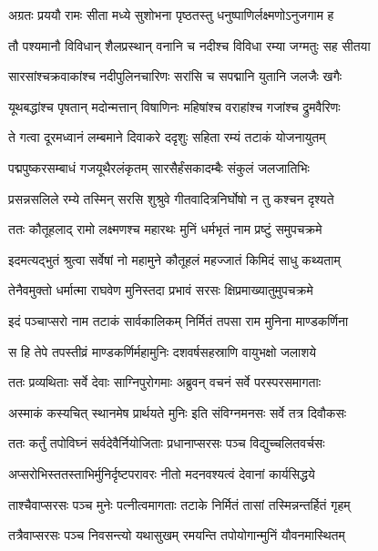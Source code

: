 
\twolineshloka
{अग्रतः प्रययौ रामः सीता मध्ये सुशोभना}
{पृष्ठतस्तु धनुष्पाणिर्लक्ष्मणोऽनुजगाम ह} %

\twolineshloka
{तौ पश्यमानौ विविधान् शैलप्रस्थान् वनानि च}
{नदीश्च विविधा रम्या जग्मतुः सह सीतया} %

\twolineshloka
{सारसांश्चक्रवाकांश्च नदीपुलिनचारिणः}
{सरांसि च सपद्मानि युतानि जलजैः खगैः} %

\twolineshloka
{यूथबद्धांश्च पृषतान् मदोन्मत्तान् विषाणिनः}
{महिषांश्च वराहांश्च गजांश्च द्रुमवैरिणः} %

\twolineshloka
{ते गत्वा दूरमध्वानं लम्बमाने दिवाकरे}
{ददृशुः सहिता रम्यं तटाकं योजनायुतम्} %

\twolineshloka
{पद्मपुष्करसम्बाधं गजयूथैरलंकृतम्}
{सारसैर्हंसकादम्बैः संकुलं जलजातिभिः} %

\twolineshloka
{प्रसन्नसलिले रम्ये तस्मिन् सरसि शुश्रुवे}
{गीतवादित्रनिर्घोषो न तु कश्चन दृश्यते} %

\twolineshloka
{ततः कौतूहलाद् रामो लक्ष्मणश्च महारथः}
{मुनिं धर्मभृतं नाम प्रष्टुं समुपचक्रमे} %

\twolineshloka
{इदमत्यद्भुतं श्रुत्वा सर्वेषां नो महामुने}
{कौतूहलं महज्जातं किमिदं साधु कथ्यताम्} %

\twolineshloka
{तेनैवमुक्तो धर्मात्मा राघवेण मुनिस्तदा}
{प्रभावं सरसः क्षिप्रमाख्यातुमुपचक्रमे} %

\twolineshloka
{इदं पञ्चाप्सरो नाम तटाकं सार्वकालिकम्}
{निर्मितं तपसा राम मुनिना माण्डकर्णिना} %

\twolineshloka
{स हि तेपे तपस्तीव्रं माण्डकर्णिर्महामुनिः}
{दशवर्षसहस्राणि वायुभक्षो जलाशये} %

\twolineshloka
{ततः प्रव्यथिताः सर्वे देवाः साग्निपुरोगमाः}
{अब्रुवन् वचनं सर्वे परस्परसमागताः} %

\twolineshloka
{अस्माकं कस्यचित् स्थानमेष प्रार्थयते मुनिः}
{इति संविग्नमनसः सर्वे तत्र दिवौकसः} %

\twolineshloka
{ततः कर्तुं तपोविघ्नं सर्वदेवैर्नियोजिताः}
{प्रधानाप्सरसः पञ्च विद्युच्चलितवर्चसः} %

\twolineshloka
{अप्सरोभिस्ततस्ताभिर्मुनिर्दृष्टपरावरः}
{नीतो मदनवश्यत्वं देवानां कार्यसिद्धये} %

\twolineshloka
{ताश्चैवाप्सरसः पञ्च मुनेः पत्नीत्वमागताः}
{तटाके निर्मितं तासां तस्मिन्नन्तर्हितं गृहम्} %

\twolineshloka
{तत्रैवाप्सरसः पञ्च निवसन्त्यो यथासुखम्}
{रमयन्ति तपोयोगान्मुनिं यौवनमास्थितम्} %

